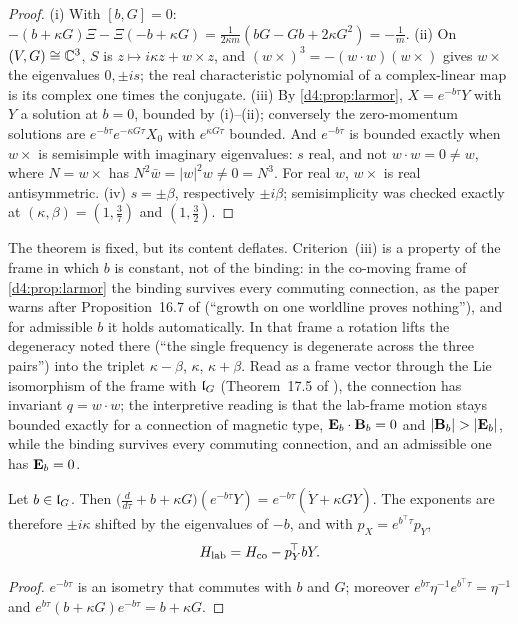 \begin{proof}
(i) With $[b,G]=0$: $-(b+\kappa G)\Xi-\Xi(-b+\kappa G)=\frac1{2\kappa m}(bG-Gb+2\kappa G^2)=-\frac1m$. (ii) On $(V,G)\cong\mathbb{C}^3$, $S$ is
$z\mapsto i\kappa z+w\times z$, and $(w\times)^3=-(w\cdot w)(w\times)$ gives $w\times$ the eigenvalues $0,\pm is$; the real characteristic polynomial
of a complex-linear map is its complex one times the conjugate. (iii) By \cref{d4:prop:larmor}, $X=e^{-b\tau}Y$ with $Y$ a solution at $b=0$,
bounded by (i)--(ii); conversely the zero-momentum solutions are $e^{-b\tau}e^{-\kappa G\tau}X_0$ with $e^{\kappa G\tau}$ bounded. And $e^{-b\tau}$ is
bounded exactly when $w\times$ is semisimple with imaginary eigenvalues: $s$ real, and not $w\cdot w=0\neq w$, where $N=w\times$ has
$N^2\bar w=|w|^2w\neq0=N^3$. For real $w$, $w\times$ is real antisymmetric. (iv) $s=\pm\beta$, respectively $\pm i\beta$; semisimplicity was checked
exactly at $(\kappa,\beta)=(1,\tfrac37)$ and $(1,\tfrac32)$.
\end{proof}

The theorem is fixed, but its content deflates. Criterion~(iii) is a property of the frame in which $b$ is constant, not of the binding: in the
co-moving frame of \cref{d4:prop:larmor} the binding survives every commuting connection, as the paper warns after Proposition~16.7 of
\cite{ES17} (``growth on one worldline proves nothing''), and for admissible $b$ it holds automatically. In that frame a rotation lifts the
degeneracy noted there (``the single frequency is degenerate across the three pairs'') into the triplet $\kappa-\beta$, $\kappa$, $\kappa+\beta$.
Read as a frame vector through the Lie isomorphism of the frame with $\mathfrak l_G$ (Theorem~17.5 of \cite{ES17}), the connection has invariant
$q=w\cdot w$; the interpretive reading is that the lab-frame motion stays bounded exactly for a connection of magnetic type,
$\mathbf E_b\cdot\mathbf B_b=0$ and $|\bB_b|>|\bE_b|$, while the binding survives every commuting connection, and an admissible one has $\mathbf E_b=0$.

\begin{proposition}
\label{d4:prop:larmor}
Let $b\in\mathfrak l_G$. Then $\bigl(\tfrac d{d\tau}+b+\kappa G\bigr)(e^{-b\tau}Y)=e^{-b\tau}(\dot Y+\kappa GY)$. The exponents are therefore $\pm i\kappa$ shifted by the
eigenvalues of $-b$, and with $p_X=e^{b^{\!\top}\tau}p_Y$,
\[
H_{\rm lab}=H_{\rm co}-p_Y^{\!\top}bY.
\]
\end{proposition}

\begin{proof}
$e^{-b\tau}$ is an isometry that commutes with $b$ and $G$; moreover $e^{b\tau}\eta^{-1}e^{b^{\!\top}\tau}=\eta^{-1}$ and
$e^{b\tau}(b+\kappa G)e^{-b\tau}=b+\kappa G$.
\end{proof}

